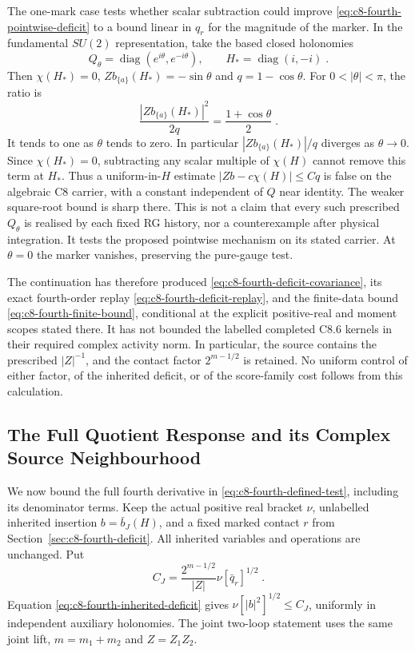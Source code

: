 \documentclass[11pt]{article}
\begin{document}
The one-mark case tests whether scalar subtraction could improve
\eqref{eq:c8-fourth-pointwise-deficit} to a bound linear in $q_r$ for
the magnitude of the marker. In the fundamental $SU(2)$ representation,
take the based closed holonomies
\begin{equation}\label{eq:c8-fourth-sharp-holonomies}
    Q_\theta=\operatorname{diag}(e^{i\theta},e^{-i\theta}),
    \qquad H_*=\operatorname{diag}(i,-i)\;.
\end{equation}
Then $\chi(H_*)=0$, $Zb_{\{a\}}(H_*)=-\sin\theta$ and
$q=1-\cos\theta$. For $0<|\theta|<\pi$, the ratio is
\begin{equation}\label{eq:c8-fourth-sharp-ratio}
    \frac{|Zb_{\{a\}}(H_*)|^2}{2q}
        =\frac{1+\cos\theta}{2}\;.
\end{equation}
It tends to one as $\theta$ tends to zero.
In particular $|Zb_{\{a\}}(H_*)|/q$ diverges as
$\theta\longrightarrow0$. Since $\chi(H_*)=0$, subtracting any
scalar multiple of $\chi(H)$ cannot remove this term at $H_*$.
Thus a uniform-in-$H$ estimate $|Zb-c\chi(H)|\leq Cq$ is false on
the algebraic C8 carrier, with a constant independent of $Q$ near
identity. The weaker square-root bound is sharp there. This is not a
claim that every such prescribed $Q_\theta$ is realised by each fixed
RG history, nor a counterexample after physical integration. It tests
the proposed pointwise mechanism on its stated carrier. At
$\theta=0$ the marker vanishes, preserving the pure-gauge test.

The continuation has therefore produced
\eqref{eq:c8-fourth-deficit-covariance}, its exact fourth-order
replay \eqref{eq:c8-fourth-deficit-replay}, and the finite-data bound
\eqref{eq:c8-fourth-finite-bound}, conditional at the
explicit positive-real and moment scopes stated there. It has not
bounded the labelled completed C8.6 kernels in their required complex
activity norm. In particular, the source contains the prescribed
$|Z|^{-1}$, and the contact factor $2^{m-1/2}$ is retained. No
uniform control of either factor, of the inherited deficit, or of
the score-family cost follows from this calculation.

\subsection{The Full Quotient Response and its Complex Source Neighbourhood}
\label{sec:c8-fourth-full-response}

We now bound the full fourth derivative in
\eqref{eq:c8-fourth-defined-test}, including its denominator terms.
Keep the actual positive real bracket $\nu$, unlabelled inherited
insertion $b=\bar b_J(H)$, and a fixed marked contact $r$ from
Section~\ref{sec:c8-fourth-deficit}. All inherited variables and
operations are unchanged. Put
\begin{equation}\label{eq:c8-fourth-source-size}
    C_J=\frac{2^{m-1/2}}{|Z|}\nu[\bar q_r]^{1/2}\;.
\end{equation}
Equation \eqref{eq:c8-fourth-inherited-deficit} gives
$\nu[|b|^2]^{1/2}\leq C_J$, uniformly in independent auxiliary
holonomies. The joint two-loop statement uses the same joint lift,
$m=m_1+m_2$ and $Z=Z_1Z_2$.
\end{document}
